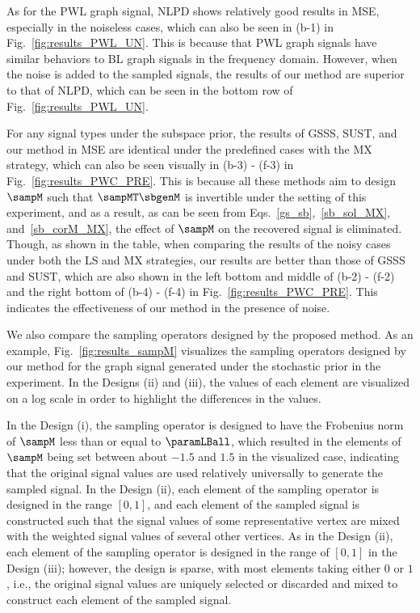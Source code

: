 \documentclass[journal]{IEEEtran}
\begin{document}
As for the PWL graph signal, NLPD shows relatively good results in MSE, especially in the noiseless cases, which can also be seen in (b-1) in Fig.~\ref{fig:results_PWL_UN}.
This is because that PWL graph signals have similar behaviors to BL graph signals in the frequency domain.
However, when the noise is added to the sampled signals, the results of our method are superior to that of NLPD, which can be seen in the bottom row of Fig.~\ref{fig:results_PWL_UN}.
 
For any signal types under the subspace prior, the results of GSSS, SUST, and our method in MSE are identical under the predefined cases with the MX strategy, which can also be seen visually in (b-3) - (f-3) in Fig.~\ref{fig:results_PWC_PRE}.
This is because all these methods aim to design $\sampM$ such that $\sampMT \sbgenM$ is invertible under the setting of this experiment, and as a result, as can be seen from Eqs.~\eqref{gs_sb},~\eqref{sb_sol_MX}, and~\eqref{sb_corM_MX}, the effect of $\sampM$ on the recovered signal is eliminated.
Though, as shown in the table, when comparing the results of the noisy cases under both the LS and MX strategies, our results are better than those of GSSS and SUST, which are also shown in the left bottom and middle of (b-2) - (f-2) and the right bottom of (b-4) - (f-4) in Fig.~\ref{fig:results_PWC_PRE}. 
This indicates the effectiveness of our method in the presence of noise.

We also compare the sampling operators designed by the proposed method.
As an example, Fig.~\ref{fig:results_sampM} visualizes the sampling operators designed by our method for the graph signal generated under the stochastic prior in the experiment.
In the Designs (ii) and (iii), the values of each element are visualized on a log scale in order to highlight the differences in the values.

In the Design (i), the sampling operator is designed to have the Frobenius norm of $\sampM$ less than or equal to $\paramLBall$, which resulted in the elements of $\sampM$ being set between about $-1.5$ and $1.5$ in the visualized case, indicating that the original signal values are used relatively universally to generate the sampled signal.
In the Design (ii), each element of the sampling operator is designed in the range $[0,1]$, and each element of the sampled signal is constructed such that the signal values of some representative vertex are mixed with the weighted signal values of several other vertices.
As in the Design (ii), each element of the sampling operator is designed in the range of $[0,1]$ in the Design (iii); however, the design is sparse, with most elements taking either $0$ or $1$, i.e., the original signal values are uniquely selected or discarded and mixed to construct each element of the sampled signal.
\end{document}
